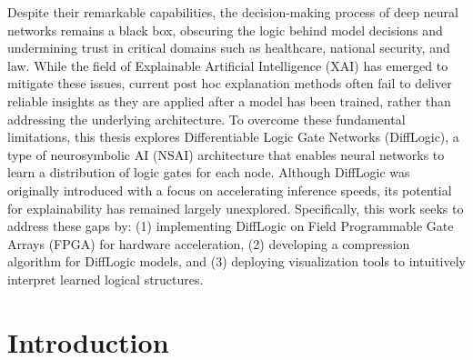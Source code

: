 
Despite their remarkable capabilities, the decision-making process of deep neural networks remains a black box, obscuring the logic behind model decisions and undermining trust in critical domains such as healthcare, national security, and law. While the field of Explainable Artificial Intelligence (XAI) has emerged to mitigate these issues, current post hoc explanation methods often fail to deliver reliable insights as they are applied after a model has been trained, rather than addressing the underlying architecture. To overcome these fundamental limitations, this thesis explores Differentiable Logic Gate Networks (DiffLogic), a type of neurosymbolic AI (NSAI) architecture that enables neural networks to learn a distribution of logic gates for each node. Although DiffLogic was originally introduced with a focus on accelerating inference speeds, its potential for explainability has remained largely unexplored. Specifically, this work seeks to address these gaps by: (1) implementing DiffLogic on Field Programmable Gate Arrays (FPGA) for hardware acceleration, (2) developing a compression algorithm for DiffLogic models, and (3) deploying visualization tools to intuitively interpret learned logical structures. 








\chapter{Introduction}
\label{chap:introduction}

